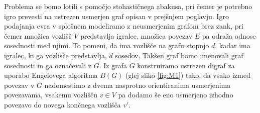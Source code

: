 \documentclass[twoside,11pt]{article}
\begin{document}
Problema se bomo lotili s pomočjo stohastičnega abakusa, pri čemer je potrebno igro prevesti na ustrezen usmerjen graf opisan v prejšnjem poglavju. Igro podajanja evra v splošnem modeliramo z neusmerjenim grafom brez zank, pri čemer množica vozlišč $V$ predstavlja igralce, množica povezav $E$ pa odraža odnose sosednosti med njimi.
To pomeni, da ima vozlišče na grafu stopnjo $d$, kadar ima igralec, ki ga vozlišče predstavlja, $d$ sosedov. Takšen graf bomo imenovali graf sosednosti in ga označevali z $G$. 
Iz grafa $G$ konstruiramo ustrezen digraf za uporabo Engelovega algoritma $B(G)$ (glej sliko \ref{fig:M1}) tako, da vsako izmed povezav v $G$ nadomestimo z dvema nasprotno orientiranima usmerjenima povezavama, vsakemu vozlišču $v\in V$ pa dodamo še eno usmerjeno izhodno povezavo do novega končnega vozlišča $v'$. 
 
\end{document}
